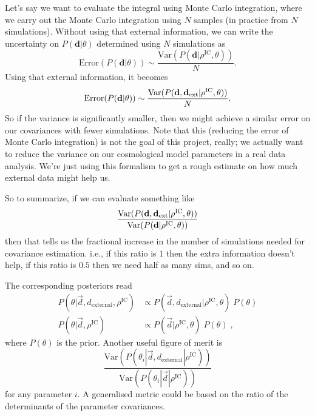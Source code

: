 \documentclass[preprint]{aastex}
\newcommand{\data}{\mathbf{d}}
\newcommand{\dataext}{\data_{\rm ext}}
\begin{document}
Let's say we want to evaluate the integral using Monte Carlo integration, where we carry out the
Monte Carlo integration using $N$ samples (in practice from $N$ simulations).  Without using that
external information, we can write the uncertainty on $P(\data|\theta)$ determined using $N$
simulations as
\begin{equation}
	\text{Error}(P(\data|\theta)) \sim \frac{\text{Var}(P(\data|\rho^\text{IC},\theta))}{N}.
\end{equation}
Using that external information, it becomes
\begin{equation}
	\text{Error}(P(\data|\theta)) \sim \frac{\text{Var}(P(\data,\dataext|\rho^\text{IC},\theta))}{N}.
\end{equation}
So if the variance is significantly smaller, then we might achieve a similar error on our
covariances with fewer simulations.  Note that this (reducing the error of Monte Carlo integration)
is not the goal of this project, really; we actually want to reduce the variance on our cosmological
model parameters in a real data analysis.  We're just using this formalism to get a rough estimate
on how much external data might help us.

So to summarize, if we can evaluate something like
\begin{equation}
	\frac{\text{Var}(P(\data,\dataext|\rho^\text{IC},\theta))}{\text{Var}(P(\data|\rho^\text{IC},\theta))}
\end{equation}
then that tells us the fractional increase in the number of simulations needed for covariance
estimation.  i.e., if this ratio is $1$ then the extra information doesn't help, if this ratio is
$0.5$ then we need half as many sims, and so on.

The corresponding posteriors read
\begin{align}
P(\theta | \vec{d},d_\text{external},\rho^\text{IC}) &\propto P(\vec{d},d_\text{external}|\rho^\text{IC},\theta)\; P(\theta)\\
P(\theta | \vec{d},\rho^\text{IC}) &\propto P(\vec{d}|\rho^\text{IC},\theta)\; P(\theta)\;,
\end{align}
where $P(\theta)$ is the prior. Another useful figure of merit is
\begin{equation}
\frac{\text{Var}(P(\theta_i | \vec{d},d_\text{external}|\rho^\text{IC}))}{\text{Var}(P(\theta_i | \vec{d}|\rho^\text{IC}))}
\end{equation}
for any parameter $i$. A generalised metric could be based on the ratio of the determinants of the parameter covariances.
\end{document}
